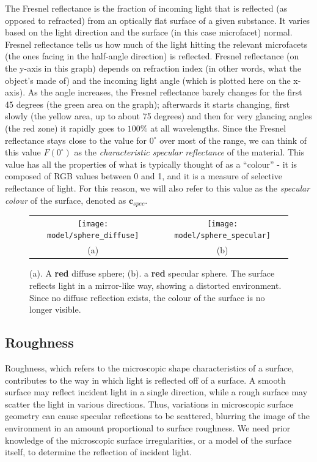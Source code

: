 The Fresnel reflectance is the fraction of incoming light that is reflected (as opposed to refracted) from an optically flat surface of a given substance. It varies based on the light direction and the surface (in this case microfacet) normal. Fresnel reflectance tells us how much of the light hitting the relevant microfacets (the ones facing in the half-angle direction) is reflected. Fresnel reflectance (on the y-axis in this graph) depends on refraction index (in other words, what the object’s made of) and the incoming light angle (which is plotted here on the x-axis). As the angle increases, the Fresnel reflectance barely changes for the first 45 degrees (the green area on the graph); afterwards it starts changing, first slowly (the yellow area, up to about 75 degrees) and then for very glancing angles (the red zone) it rapidly goes to $100\%$ at all wavelengths. Since the Fresnel reflectance stays close to the value for $0^\circ$ over most of the range, we can think of this value $F(0^\circ)$ as the \textit{characteristic specular reflectance} of the material. This value has all the properties of what is typically thought of as a ``colour'' - it is composed of RGB values between 0 and 1, and it is a measure of selective reflectance of light. For this reason, we will also refer to this value as the \textit{specular colour} of the surface, denoted as $\mathbf{c}_{spec}$.
\begin{figure}[!htbp]
\centering
\begin{tabular}{cc}
\texttt{[image: model/sphere\_diffuse]}&
\texttt{[image: model/sphere\_specular]}\\
(a) & (b)\\
\end{tabular}
\caption{(a). A \textbf{red} diffuse sphere; (b). a \textbf{red} specular sphere. The surface reflects light in a mirror-like way, showing a distorted environment. Since no diffuse reflection exists, the colour of the surface is no longer visible.}
\label{fig:spec_ref}
\end{figure}

\subsection{Roughness}
Roughness, which refers to the microscopic shape characteristics of a surface, contributes to the way in which light is reflected off of a surface. A smooth surface may reflect incident light in a single direction, while a rough surface may scatter the light in various directions. Thus, variations in microscopic surface geometry can cause specular reflections to be scattered, blurring the image of the environment in an amount proportional to surface roughness. We need prior knowledge of the microscopic surface irregularities, or a model of the surface itself, to determine the reflection of incident light.

